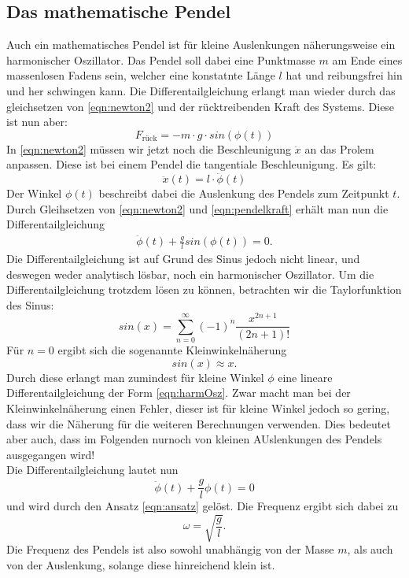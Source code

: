\subsection{Das mathematische Pendel}
Auch ein mathematisches Pendel ist für kleine Auslenkungen näherungsweise ein harmonischer Oszillator. Das Pendel soll dabei eine
Punktmasse $m$ am Ende eines massenlosen Fadens sein, welcher eine konstatnte Länge $l$ hat und reibungsfrei hin und her schwingen kann.
Die Differentailgleichung erlangt man wieder durch das gleichsetzen von \eqref{eqn:newton2} und der rücktreibenden Kraft des Systems.
Diese ist nun aber:
\begin{equation}
    F_\text{rück}=-m\cdot g\cdot sin(\phi(t)) \label{eqn:pendelkraft}
\end{equation}
In \eqref{eqn:newton2} müssen wir jetzt noch die Beschleunigung $\ddot x$ an das Prolem anpassen. Diese ist bei einem Pendel die tangentiale
Beschleunigung. Es gilt:
\begin{equation}
    \ddot x(t)=l\cdot \ddot{\phi}(t)
\end{equation}
Der Winkel $\phi(t)$ beschreibt dabei die Auslenkung des Pendels zum Zeitpunkt $t$. Durch Gleihsetzen von \eqref{eqn:newton2} und 
\eqref{eqn:pendelkraft} erhält man nun die Differentailgleichung
\begin{eqnarray}
    \ddot{\phi}(t)+\frac{g}{l}sin(\phi(t))=0.
\end{eqnarray}
Die Differentailgleichung ist auf Grund des Sinus jedoch nicht linear, und deswegen weder analytisch lösbar, noch ein harmonischer Oszillator.
Um die Differentailgleichung trotzdem lösen zu können, betrachten wir die Taylorfunktion des Sinus:
\begin{equation}
    sin(x)=\sum_{n=0}^\infty (-1)^n\frac{x^{2n+1}}{(2n+1)!}
\end{equation}
Für $n=0$ ergibt sich die sogenannte Kleinwinkelnäherung
\begin{equation}
    sin(x)\approx x.
\end{equation}
Durch diese erlangt man zumindest für kleine Winkel $\phi$ eine lineare Differentailgleichung der Form \eqref{eqn:harmOsz}. Zwar macht man bei der 
Kleinwinkelnäherung einen Fehler, dieser ist für kleine Winkel jedoch so gering, dass wir die Näherung für die weiteren Berechnungen verwenden.
Dies bedeutet aber auch, dass im Folgenden nurnoch von kleinen AUslenkungen des Pendels ausgegangen wird!
\\
Die Differentailgleichung lautet nun
\begin{equation}
    \ddot{\phi}(t)+\frac{g}{l}\phi(t)=0
\end{equation}
und wird durch den Ansatz \eqref{eqn:ansatz} gelöst. Die Frequenz ergibt sich dabei zu
\begin{equation}
    \omega=\sqrt{\frac{g}{l}}.
\end{equation}
Die Frequenz des Pendels ist also sowohl unabhängig von der Masse $m$, als auch von der Auslenkung, solange diese hinreichend klein ist.

